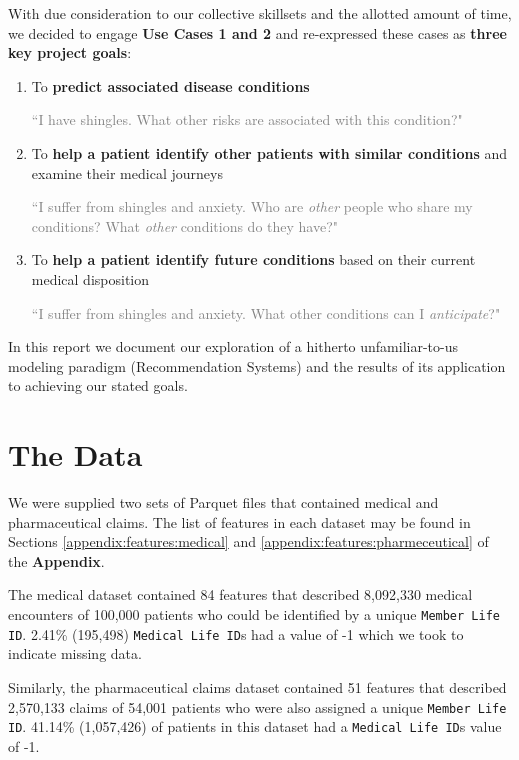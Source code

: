 \documentclass[twoside,11pt]{article}
\begin{document}
With due consideration to our collective skillsets and the allotted amount of time, we decided to engage \textbf{Use Cases 1 and 2} and re-expressed these cases as \textbf{three key project goals}:
\begin{enumerate}
  \item To \textbf{predict associated disease conditions}

\textcolor{gray}{``I have shingles. What other risks are associated with this condition?"}

  \item To \textbf{help a patient identify other patients with similar conditions} and examine their medical journeys

\textcolor{gray}{``I suffer from shingles and anxiety. Who are \textit{other} people who share my conditions? What \textit{other} conditions do they have?"}

  \item To \textbf{help a patient identify future conditions} based on their current medical disposition

\textcolor{gray}{``I suffer from shingles and anxiety. What other conditions can I \textit{anticipate}?"}

\end{enumerate}

In this report we document our exploration of a hitherto unfamiliar-to-us modeling paradigm (Recommendation Systems) and the results of its application to achieving our stated goals.

\newpage


\section{The Data}

We were supplied two sets of Parquet files that contained medical and pharmaceutical claims. The list of features in each dataset may be found in Sections \ref{appendix:features:medical} and \ref{appendix:features:pharmeceutical} of the \textbf{Appendix}.

The medical dataset contained 84 features that described 8,092,330 medical encounters of 100,000 patients who could be identified by a unique \texttt{Member Life ID}. 2.41\% (195,498) \texttt{Medical Life ID}s had a value of -1 which we took to indicate missing data.

Similarly, the pharmaceutical claims dataset contained 51 features that described 2,570,133 claims of 54,001 patients who were also assigned a unique \texttt{Member Life ID}. 41.14\% (1,057,426) of patients in this dataset had a \texttt{Medical Life ID}s value of -1.
\end{document}
